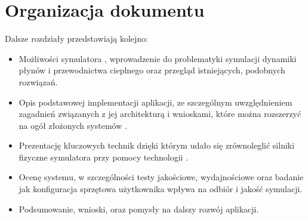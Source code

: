\clearpage


\section{Organizacja dokumentu}
\label{sec:organizacjaDokumentu}

Dalsze rozdziały przedstawiają kolejno:

\begin{itemize} \item Możliwości symulatora \en, wprowadzenie
do problematyki symulacji dynamiki płynów i przewodnictwa cieplnego oraz
przegląd istniejących, podobnych rozwiązań.

\item Opis podstawowej implementacji aplikacji, ze szczególnym uwzględnieniem
zagadnień związanych z jej architekturą i wnioskami, które można rozszerzyć na
ogół złożonych systemów .

\item Prezentację kluczowych technik dzięki którym udało się zrównoleglić
silniki fizyczne symulatora \en przy pomocy technologii .

\item Ocenę systemu, w szczególności testy jakościowe, wydajnościowe oraz
badanie jak konfiguracja sprzętowa użytkownika wpływa na odbiór i jakość
symulacji.

\item Podsumowanie, wnioski, oraz pomysły na dalszy rozwój aplikacji.
\end{itemize}
